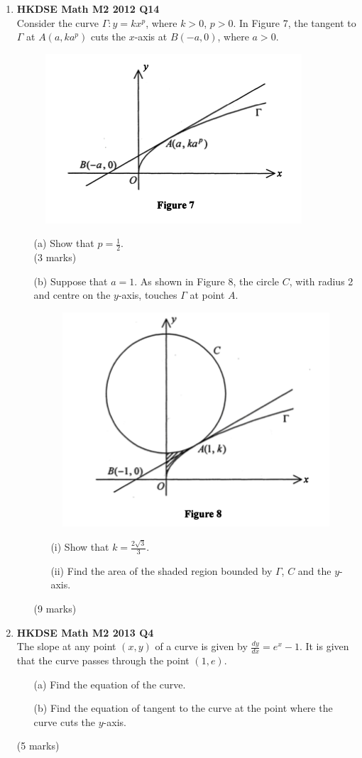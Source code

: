 \documentclass{report}
\begin{document}
\begin{enumerate}
	\item \textbf{HKDSE Math M2 2012 Q14}\\
	Consider the curve $\Gamma : y = kx^p$, where $k>0$, $p > 0$. In Figure 7, the tangent to $\Gamma$ at $A(a, ka^{p})$ cuts the $x$-axis at $B(-a, 0)$, where $a>0$.
	\begin{figure}[H]
		\centering
		\includegraphics[width = .5\linewidth]{2012Figure7}
	\end{figure}
	\begin{enumerate}
		\item [(a)]Show that $\displaystyle p = \frac{1}{2}$. \\(3 marks)
		\item [(b)]Suppose that $a = 1$. As shown in Figure 8, the circle $C$, with radius 2 and centre on the $y$-axis, touches $\Gamma$ at point $A$.
		\begin{figure}[H]
			\centering
			\includegraphics[width = .5\linewidth]{2012Figure8}
		\end{figure}
		\begin{enumerate}
			\item [(i)]Show that $\displaystyle k = \frac{2\sqrt{3}}{3}$. 
			\item [(ii)]Find the area of the shaded region bounded by $\Gamma$, $C$ and the $y$-axis.
		\end{enumerate}
		(9 marks)
	\end{enumerate}

	\item \textbf{HKDSE Math M2 2013 Q4}\\
	The slope at any point $(x,y)$ of a curve is given by $\displaystyle\frac{dy}{dx} = e^x - 1$. It is given that the curve passes through the point $(1,e)$. 
	\begin{enumerate}
		\item [(a)]Find the equation of the curve.
		\item [(b)]Find the equation of tangent to the curve at the point where the curve cuts the $y$-axis.
	\end{enumerate}
	(5 marks)


\end{enumerate}
\end{document}
